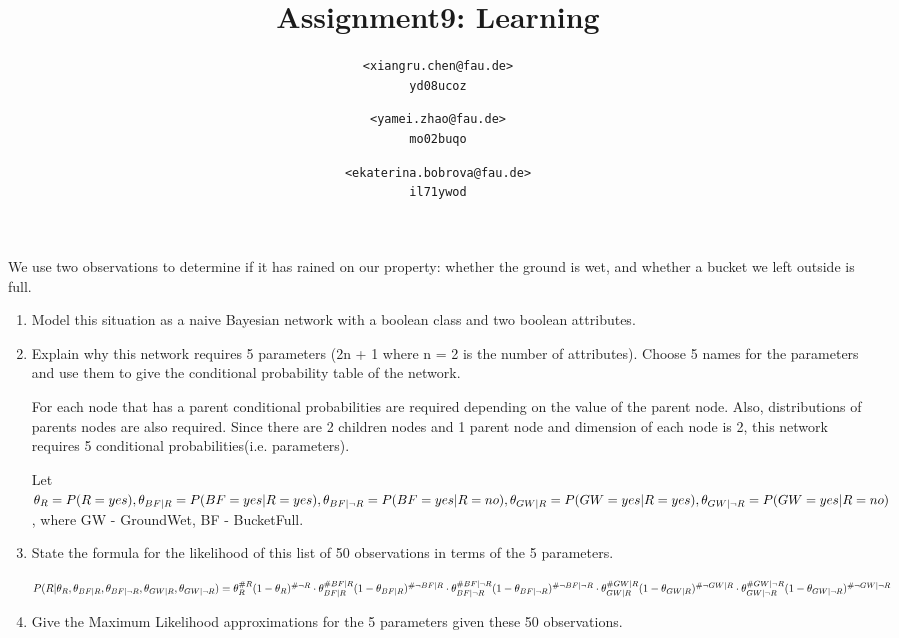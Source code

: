\documentclass{homework}
\title{Assignment9: Learning}
\author{
  \texttt{<xiangru.chen@fau.de>} \\
  \texttt{yd08ucoz}
  \and
 \texttt{<yamei.zhao@fau.de>}\\
  \texttt{mo02buqo}
  \and
  \texttt{<ekaterina.bobrova@fau.de>}\\
  \texttt{il71ywod}
}
\begin{document}
\maketitle

We use two observations to determine if it has rained on our property: whether the ground is wet, and whether a bucket we left outside is full.
\begin{enumerate}
	\item Model this situation as a naive Bayesian network with a boolean class and two boolean attributes.
		\begin{center}
		\end{center}
	\item Explain why this network requires 5 parameters (2n + 1 where n = 2 is the number of attributes). Choose 5 names for the parameters and use them to give the conditional probability table of the network.

	For each node that has a parent conditional probabilities are required depending on the value of the parent node.  Also, distributions of parents nodes are also required. Since there are 2 children nodes and 1 parent node and dimension of each node is 2,  this network requires 5 conditional probabilities(i.e. parameters).

	Let $\theta_R = P(R=yes), \theta_{BF|R} = P(BF=yes|R=yes),\theta_{BF|\lnot R} = P(BF=yes|R=no), \newline\theta_{GW|R} = P(GW=yes|R=yes), \theta_{GW|\lnot R} = P(GW=yes|R=no)$, where GW - GroundWet, BF - BucketFull.

\item State the formula for the likelihood of this list of 50 observations in terms of the 5 parameters.

$P(R|\theta_R, \theta_{BF|R}, \theta_{BF|\lnot R},\theta_{GW|R},\theta_{GW|\lnot R})=\theta_R^{\# R}(1-\theta_R)^{\# \lnot R}\cdot \theta_{BF|R}^{\# BF|R}(1-\theta_{BF|R})^{\# \lnot BF|R}\cdot\newline \theta_{BF|\lnot R}^{\# BF|\lnot R}(1-\theta_{BF|\lnot R})^{\# \lnot BF|\lnot R}\cdot \theta_{GW|R}^{\# GW|R}(1-\theta_{GW|R})^{\# \lnot GW|R}\cdot \theta_{GW|\lnot R}^{\# GW|\lnot R}(1-\theta_{GW|\lnot R})^{\# \lnot GW|\lnot R}$
\item Give the Maximum Likelihood approximations for the 5 parameters given these 50 observations.


\end{enumerate}
\end{document}
